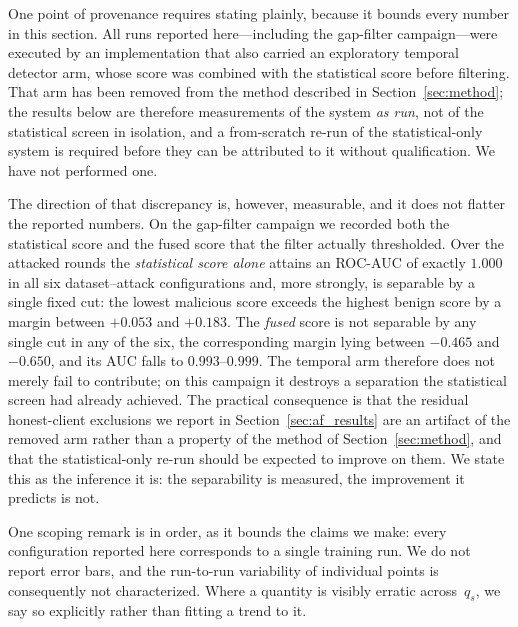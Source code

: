 \documentclass[journal]{IEEEtran}
\begin{document}
One point of provenance requires stating plainly, because it bounds every number in this section. All runs reported here---including the gap-filter campaign---were executed by an implementation that also carried an exploratory temporal detector arm, whose score was combined with the statistical score before filtering. That arm has been removed from the method described in Section~\ref{sec:method}; the results below are therefore measurements of the system \emph{as run}, not of the statistical screen in isolation, and a from-scratch re-run of the statistical-only system is required before they can be attributed to it without qualification. We have not performed one.

The direction of that discrepancy is, however, measurable, and it does not flatter the reported numbers. On the gap-filter campaign we recorded both the statistical score and the fused score that the filter actually thresholded. Over the attacked rounds the \emph{statistical score alone} attains an ROC-AUC of exactly $1.000$ in all six dataset--attack configurations and, more strongly, is separable by a single fixed cut: the lowest malicious score exceeds the highest benign score by a margin between $+0.053$ and $+0.183$. The \emph{fused} score is not separable by any single cut in any of the six, the corresponding margin lying between $-0.465$ and $-0.650$, and its AUC falls to $0.993$--$0.999$. The temporal arm therefore does not merely fail to contribute; on this campaign it destroys a separation the statistical screen had already achieved. The practical consequence is that the residual honest-client exclusions we report in Section~\ref{sec:af_results} are an artifact of the removed arm rather than a property of the method of Section~\ref{sec:method}, and that the statistical-only re-run should be expected to improve on them. We state this as the inference it is: the separability is measured, the improvement it predicts is not.

One scoping remark is in order, as it bounds the claims we make: every configuration reported here corresponds to a single training run. We do not report error bars, and the run-to-run variability of individual points is consequently not characterized. Where a quantity is visibly erratic across~$q_s$, we say so explicitly rather than fitting a trend to it.
\end{document}

